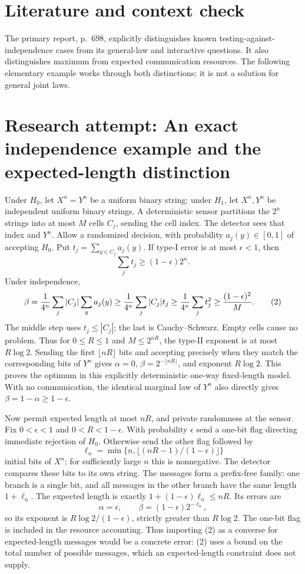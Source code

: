 \documentclass[11pt]{article}
\begin{document}
\section{Literature and context check}
The primary report, p.~698, explicitly distinguishes known testing-against-independence cases from its general-law and interactive questions. It also distinguishes maximum from expected communication resources. The following elementary example works through both distinctions; it is not a solution for general joint laws.
\section{Research attempt: An exact independence example and the expected-length distinction}
Under $H_0$, let $X^n=Y^n$ be a uniform binary string; under $H_1$, let $X^n,Y^n$ be independent uniform binary strings. A deterministic sensor partitions the $2^n$ strings into at most $M$ cells $C_j$, sending the cell index. The detector sees that index and $Y^n$. Allow a randomized decision, with probability $a_j(y)\in[0,1]$ of accepting $H_0$. Put $t_j=\sum_{y\in C_j}a_j(y)$. If type-I error is at most $\epsilon<1$, then
\[
 \sum_jt_j\geq(1-\epsilon)2^n.
\]
Under independence,
\[
 \beta={1\over4^n}\sum_j |C_j|\sum_y a_j(y)
 \geq {1\over4^n}\sum_j |C_j|t_j
 \geq {1\over4^n}\sum_jt_j^2
 \geq{(1-\epsilon)^2\over M}.                 \tag{2}
\]
The middle step uses $t_j\leq|C_j|$; the last is Cauchy--Schwarz. Empty cells cause no problem. Thus for $0\leq R\leq1$ and $M\leq2^{nR}$, the type-II exponent is at most $R\log2$. Sending the first $\lfloor nR\rfloor$ bits and accepting precisely when they match the corresponding bits of $Y^n$ gives $\alpha=0$, $\beta=2^{-\lfloor nR\rfloor}$, and exponent $R\log2$. This proves the optimum in this explicitly deterministic one-way fixed-length model. With no communication, the identical marginal law of $Y^n$ also directly gives $\beta=1-\alpha\geq1-\epsilon$.

Now permit expected length at most $nR$, and private randomness at the sensor. Fix $0<\epsilon<1$ and $0<R<1-\epsilon$. With probability $\epsilon$ send a one-bit flag directing immediate rejection of $H_0$. Otherwise send the other flag followed by
\[
 \ell_n=\min\{n,\lfloor(nR-1)/(1-\epsilon)\rfloor\}
\]
initial bits of $X^n$; for sufficiently large $n$ this is nonnegative. The detector compares these bits to its own string. The messages form a prefix-free family: one branch is a single bit, and all messages in the other branch have the same length $1+\ell_n$. The expected length is exactly $1+(1-\epsilon)\ell_n\leq nR$. Its errors are
\[
 \alpha=\epsilon,\qquad \beta=(1-\epsilon)2^{-\ell_n},
\]
so its exponent is $R\log2/(1-\epsilon)$, strictly greater than $R\log2$. The one-bit flag is included in the resource accounting. Thus importing (2) as a converse for expected-length messages would be a concrete error: (2) uses a bound on the total number of possible messages, which an expected-length constraint does not supply.
\end{document}

